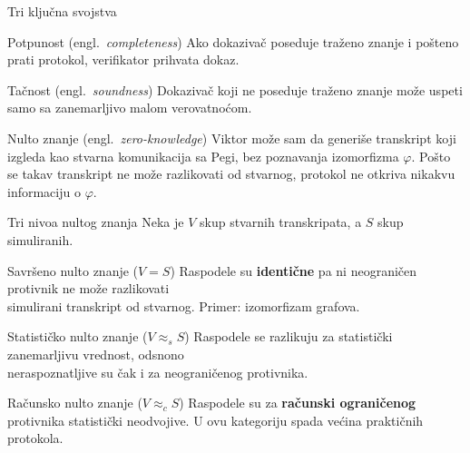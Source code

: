 ﻿\documentclass[aspectratio=1610]{beamer}
\newcommand{\keyword}[1]{\textcolor{wcprimary}{\textbf{#1}}}
\begin{document}
\begin{frame}{Tri ključna svojstva}
\vspace{4pt}
\begin{block}{\normalsize Potpunost \textnormal{(engl.\ \textit{completeness})}}
  Ako dokazivač poseduje traženo znanje i pošteno prati protokol, verifikator prihvata dokaz.
\end{block}
\begin{alertblock}{\normalsize Tačnost \textnormal{(engl.\ \textit{soundness})}}
  Dokazivač koji ne poseduje traženo znanje može uspeti samo sa zanemarljivo malom verovatnoćom.
\end{alertblock}
\begin{exampleblock}{\normalsize Nulto znanje \textnormal{(engl.\ \textit{zero-knowledge})}}
  Viktor može sam da generiše transkript koji izgleda kao stvarna
  komunikacija sa Pegi, bez poznavanja izomorfizma $\varphi$.
  Pošto se takav transkript ne može razlikovati od stvarnog,
  protokol ne otkriva nikakvu informaciju o $\varphi$.
\end{exampleblock}
\end{frame}

\begin{frame}{Tri nivoa nultog znanja}
\vspace{4pt}
Neka je $V$ skup stvarnih transkripata, a $S$ skup simuliranih.
\begin{block}{\normalsize Savršeno nulto znanje \textnormal{($V = S$)}}
  Raspodele su \keyword{identične} pa ni neograničen protivnik ne može razlikovati\\
  simulirani transkript od stvarnog. Primer: izomorfizam grafova.
\end{block}
\begin{alertblock}{\normalsize Statističko nulto znanje \textnormal{($V \approx_s S$)}}
  Raspodele se razlikuju za statistički zanemarljivu vrednost, odsnono\\
  neraspoznatljive su čak i za neograničenog protivnika.
\end{alertblock}
\begin{exampleblock}{\normalsize Računsko nulto znanje \textnormal{($V \approx_c S$)}}
  Raspodele su za \keyword{računski ograničenog} protivnika statistički neodvojive.
  U ovu kategoriju spada većina praktičnih protokola.
\end{exampleblock}
\end{frame}
\end{document}
